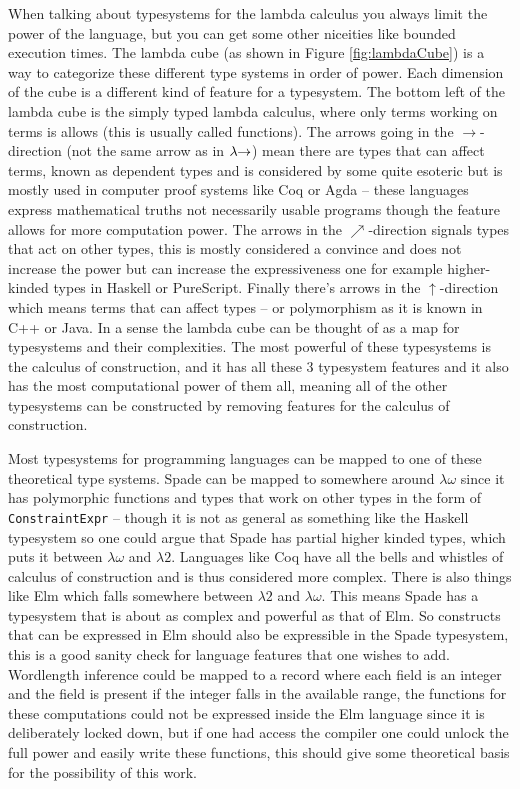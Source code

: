 When talking about typesystems for the lambda calculus you always limit the power of the language, but you can get some other niceities like bounded execution times. The lambda cube (as shown in Figure \ref{fig:lambdaCube}) is a way to categorize these different type systems in order of power. Each dimension of the cube is a different kind of feature for a typesystem. The bottom left of the lambda cube is the simply typed lambda calculus, where only terms working on terms is allows (this is usually called functions). The arrows going in the $\rightarrow$-direction (not the same arrow as in $\lambda{}\hspace{-0.3em}\rightarrow$) mean there are types that can affect terms, known as dependent types and is considered by some quite esoteric but is mostly used in computer proof systems like Coq or Agda -- these languages express mathematical truths not necessarily usable programs though the feature allows for more computation power. The arrows in the $\nearrow$-direction signals types that act on other types, this is mostly considered a convince and does not increase the power but can increase the expressiveness one for example higher-kinded types in Haskell or PureScript. Finally there's arrows in the $\uparrow$-direction which means terms that can affect types -- or polymorphism as it is known in C++ or Java. In a sense the lambda cube can be thought of as a map for typesystems and their complexities. The most powerful of these typesystems is the calculus of construction, and it has all these 3 typesystem features and it also has the most computational power of them all, meaning all of the other typesystems can be constructed by removing features for the calculus of construction.

Most typesystems for programming languages can be mapped to one of these theoretical type systems. Spade can be mapped to somewhere around $\lambda\omega$ since it has polymorphic functions and types that work on other types in the form of \verb+ConstraintExpr+ -- though it is not as general as something like the Haskell typesystem so one could argue that Spade has partial higher kinded types, which puts it between $\lambda\omega$ and $\lambda{}2$. Languages like Coq have all the bells and whistles of calculus of construction and is thus considered more complex. There is also things like Elm which falls somewhere between $\lambda{}2$ and $\lambda\omega$. This means Spade has a typesystem that is about as complex and powerful as that of Elm. So constructs that can be expressed in Elm should also be expressible in the Spade typesystem, this is a good sanity check for language features that one wishes to add. Wordlength inference could be mapped to a record where each field is an integer and the field is present if the integer falls in the available range, the functions for these computations could not be expressed inside the Elm language since it is deliberately locked down, but if one had access the compiler one could unlock the full power and easily write these functions, this should give some theoretical basis for the possibility of this work.

